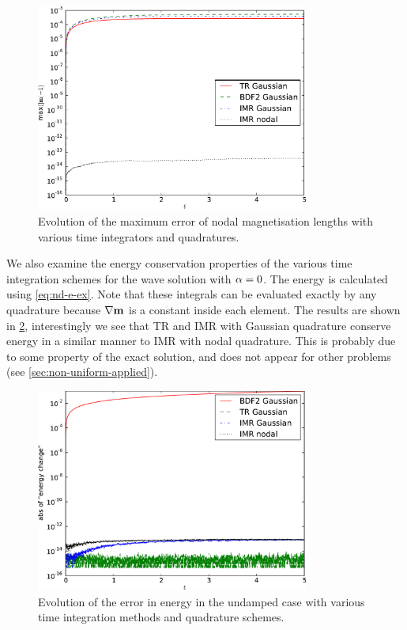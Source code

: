 \begin{figure}
  \centering
  \includegraphics[width=0.8\textwidth]{plots/2d_wave_solution_m_length/mlengtherrormaxesvstimes.pdf}
  \caption{Evolution of the maximum error of nodal magnetisation lengths with various time integrators and quadratures.}
  \label{fig:mean-ml-error-2d}
\end{figure}

We also examine the energy conservation properties of the various time integration schemes for the wave solution with $\alpha = 0$.
The energy is calculated using \cref{eq:nd-e-ex}.
Note that these integrals can be evaluated exactly by any quadrature because $\nabla \boldsymbol{\mathrm{m}}$ is a constant inside each element.
The results are shown in \cref{fig:energy-error-2d}, interestingly we see that TR and IMR with Gaussian quadrature conserve energy in a similar manner to IMR with nodal quadrature.
This is probably due to some property of the exact solution, and does not appear for other problems (see \cref{sec:non-uniform-applied}).

\begin{figure}
  \centering
  \includegraphics[width=0.8\textwidth]{plots/2d_wave_solution_energy/absofenergychangevstimes}
  \caption{Evolution of the error in energy in the undamped case with various time integration methods and quadrature schemes.}
  \label{fig:energy-error-2d}
\end{figure}


